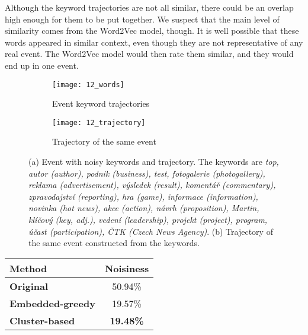 Although the keyword trajectories are not all similar, there could be an overlap high enough for them to be put together. We suspect that the main level of similarity comes from the Word2Vec model, though. It is well possible that these words appeared in similar context, even though they are not representative of any real event. The Word2Vec model would then rate them similar, and they would end up in one event.


\begin{figure}
\centering
\begin{subfigure}{.5\textwidth}
  \centering
  \texttt{[image: 12\_words]}  %
  \caption{Event keyword trajectories}
  \label{fig:noisy-keywords}
\end{subfigure}%
\begin{subfigure}{.5\textwidth}
  \centering
  \texttt{[image: 12\_trajectory]}  %
  \caption{Trajectory of the same event}
  \label{fig:noisy-trajectory}
\end{subfigure}
\caption{(a) Event with noisy keywords and trajectory. The keywords are \textit{top, autor (author), podnik (business), test, fotogalerie (photogallery), reklama (advertisement), výsledek (result), komentář (commentary), zpravodajství (reporting), hra (game), informace (information), novinka (hot news), akce (action), návrh (proposition), Martin, klíčový (key, adj.), vedení (leadership), projekt (project), program, účast (participation), ČTK (Czech News Agency)}. (b) Trajectory of the same event constructed from the keywords.}
\end{figure} \label{fig:noisy-event}


\hspace{\fill}

\begin{minipage}{\linewidth}
\centering
\begin{tabular}{ l c }\toprule[1.5pt]
\bf Method 	 & \bf Noisiness \\ \midrule
\bf Original &  50.94\% \\
\bf Embedded-greedy   &  19.57\% \\
\bf Cluster-based &  \bf 19.48\% \\ \bottomrule[1.25pt]
\end {tabular}\par
{} \label{tab:title} 
\end{minipage}

\hspace{\fill}

